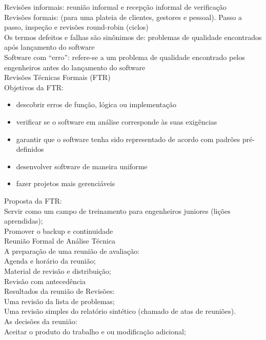 \documentclass[12pt]{article}
\begin{document}
        Revisões informais: reunião informal e recepção informal de verificação \\
        Revisões formais: (para uma plateia de clientes, gestores e pessoal). Passo a passo, inspeção e revisões round-robin (ciclos) \\
        Os termos defeitos e falhas são sinônimos de: problemas de qualidade encontrados após lançamento do software \\
        Software com “erro”: refere-se a um problema de qualidade encontrado pelos engenheiros antes do lançamento do software \\
        Revisões Técnicas Formais (FTR) \\
        Objetivos da FTR: \\
        \begin{itemize}
            \item descobrir erros de função, lógica ou implementação 
            \item verificar se o software em análise corresponde às suas exigências 
            \item garantir que o software tenha sido representado de acordo com padrões pré-definidos 
            \item desenvolver software de maneira uniforme 
            \item fazer projetos mais gerenciáveis 
        \end{itemize}
        Proposta da FTR: \\
        Servir como um campo de treinamento para engenheiros juniores (lições aprendidas);\\
        Promover o backup e continuidade \\
        Reunião Formal de Análise Técnica \\
        A preparação de uma reunião de avaliação: \\
        Agenda e horário da reunião;\\
        Material de revisão e distribuição; \\
        Revisão com antecedência\\
        Resultados da reunião de Revisões: \\
        Uma revisão da lista de problemas; \\
        Uma revisão simples do relatório sintético (chamado de atas de     reuniões).\\
        As decisões da reunião: \\
        Aceitar o produto do trabalho e ou modificação adicional;\\
\end{document}
